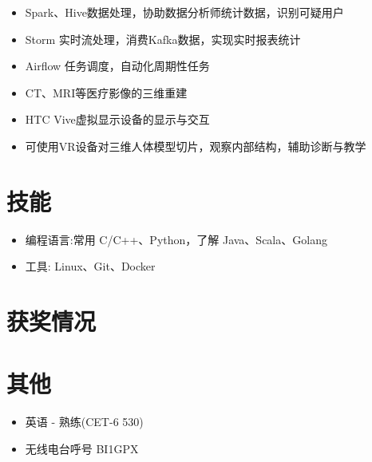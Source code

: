 \documentclass{resume}
\begin{document}
\begin{itemize}[topsep = 0 pt, partopsep = 0pt]
  \item Spark、Hive数据处理，协助数据分析师统计数据，识别可疑用户
  \item Storm 实时流处理，消费Kafka数据，实现实时报表统计
  \item Airflow 任务调度，自动化周期性任务
\end{itemize}

\begin{itemize}[topsep = 0 pt, partopsep = 0pt]
  \item CT、MRI等医疗影像的三维重建
  \item HTC Vive虚拟显示设备的显示与交互
  \item 可使用VR设备对三维人体模型切片，观察内部结构，辅助诊断与教学
\end{itemize}

\section{技能}
\begin{itemize}[parsep=0.5ex]
  \item 编程语言:常用 C/C++、Python，了解 Java、Scala、Golang
  \item 工具: Linux、Git、Docker
\end{itemize}

\section{获奖情况}

\section{ 其他}
\begin{itemize}[parsep=0.5ex]
  \item  英语 - 熟练(CET-6 530)
  \item  无线电台呼号 BI1GPX
\end{itemize}
\end{document}
